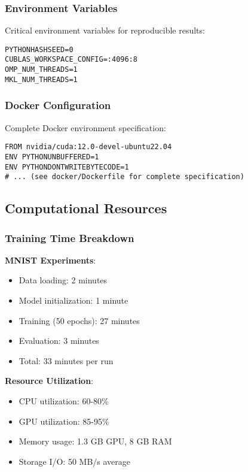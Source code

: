 \subsubsection{Environment Variables}

Critical environment variables for reproducible results:
\begin{verbatim}
PYTHONHASHSEED=0
CUBLAS_WORKSPACE_CONFIG=:4096:8
OMP_NUM_THREADS=1
MKL_NUM_THREADS=1
\end{verbatim}

\subsubsection{Docker Configuration}

Complete Docker environment specification:
\begin{verbatim}
FROM nvidia/cuda:12.0-devel-ubuntu22.04
ENV PYTHONUNBUFFERED=1
ENV PYTHONDONTWRITEBYTECODE=1
# ... (see docker/Dockerfile for complete specification)
\end{verbatim}

\subsection{Computational Resources}

\subsubsection{Training Time Breakdown}

\textbf{MNIST Experiments}:
\begin{itemize}
    \item Data loading: 2 minutes
    \item Model initialization: 1 minute
    \item Training (50 epochs): 27 minutes
    \item Evaluation: 3 minutes
    \item Total: 33 minutes per run
\end{itemize}

\textbf{Resource Utilization}:
\begin{itemize}
    \item CPU utilization: 60-80\%
    \item GPU utilization: 85-95\%
    \item Memory usage: 1.3 GB GPU, 8 GB RAM
    \item Storage I/O: 50 MB/s average
\end{itemize}

